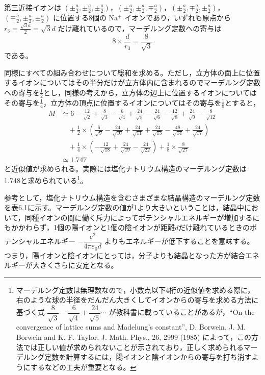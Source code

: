 \documentclass[a4paper,11pt]{ltjsarticle}
\begin{document}
第三近接イオンは $(\pm\frac{a}{2},\pm\frac{a}{2},\pm\frac{a}{2})$，$(\pm\frac{a}{2},\pm\frac{a}{2},\mp\frac{a}{2})$，$(\pm\frac{a}{2},\mp\frac{a}{2},\pm\frac{a}{2})$，$(\mp\frac{a}{2},\pm\frac{a}{2},\pm\frac{a}{2})$ に位置する8個の $\mathrm{Na^+}$ イオンであり，いずれも原点から $r_3 = \frac{\sqrt{3}a}{2} = \sqrt{3}d$ だけ離れているので，マーデルング定数への寄与は
\[
8 \times \frac{d}{r_3} = \frac{8}{\sqrt{3}}
\]
である。

同様にすべての組み合わせについて総和を求める。ただし，立方体の面上に位置するイオンについてはその半分だけが立方体内に含まれるのでマーデルング定数への寄与を$\frac{1}{2}$とし，同様の考えから，立方体の辺上に位置するイオンについてはその寄与を$\frac{1}{4}$，立方体の頂点に位置するイオンについてはその寄与を$\frac{1}{8}$とすると，
\begin{align*}
M &\simeq 6 - \frac{12}{\sqrt{2}} + \frac{8}{\sqrt{3}} - \frac{6}{\sqrt{4}} + \frac{24}{\sqrt{5}} - \frac{24}{\sqrt{6}} - \frac{12}{\sqrt{8}} + \frac{24}{\sqrt{9}} - \frac{8}{\sqrt{12}}\\
&\quad + \frac{1}{2}\times\left(\frac{6}{\sqrt{9}} - \frac{24}{\sqrt{10}} + \frac{24}{\sqrt{11}} + \frac{24}{\sqrt{13}} - \frac{48}{\sqrt{14}} + \frac{24}{\sqrt{17}}\right)\\
&\quad + \frac{1}{4}\times\left(-\frac{12}{\sqrt{18}} + \frac{24}{\sqrt{19}} - \frac{24}{\sqrt{22}}\right) + \frac{1}{8}\times\frac{8}{\sqrt{27}}\\
&\simeq 1.747
\end{align*}
と近似値が求められる。実際には塩化ナトリウム構造のマーデルング定数は1.748と求められている\footnote{マーデルング定数は無理数なので，小数点以下4桁の近似値を求める際に，右のような球の半径をだんだん大きくしてイオンからの寄与を求める方法に基づく式 $\dfrac{8}{\sqrt{3}} - \dfrac{6}{\sqrt{4}} + \dfrac{24}{\sqrt{5}} \cdots$ が教科書に載っていることがあるが，“On the convergence of lattice sums and Madelung's constant”, D. Borwein, J. M. Borwein and K. F. Taylor, J. Math. Phys., 26, 2999 (1985) によって，この方法では正しい値が求められないことが示されており，正しく求められるマーデルング定数を計算するには，陽イオンと陰イオンからの寄与を打ち消すようにするなどの工夫が重要となる。}。

参考として，塩化ナトリウム構造を含むさまざまな結晶構造のマーデルング定数を表6.1に示す。マーデルング定数の値が1より大きいということは，結晶中において，同種イオンの間に働く斥力によってポテンシャルエネルギーが増加するにもかかわらず，1個の陽イオンと1個の陰イオンが距離$d$だけ離れているときのポテンシャルエネルギー $-\dfrac{e^2}{4\pi\varepsilon_0 d}$ よりもエネルギーが低下することを意味する。つまり，陽イオンと陰イオンにとっては，分子よりも結晶となった方が結合エネルギーが大きくさらに安定となる。
\end{document}
